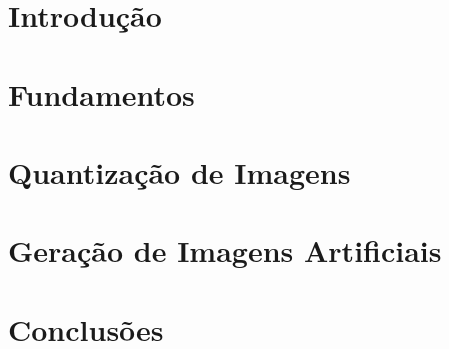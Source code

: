 \documentclass[mestrado, pos-defesa, english, brazil]{packages/icmc}
\begin{document}
\textual

\setcounter{page}{1}

\chapter{Introdução}
\label{cap:introducao}


\chapter{Fundamentos}
\label{cap:revisao}


\chapter{Quantização de Imagens}
\label{cap:quantization}


\chapter{Geração de Imagens Artificiais}
\label{cap:geracao-artificial}


\chapter{Conclusões}
\label{cap:conclusoes}


%

\postextual



%
% 
\end{document}
